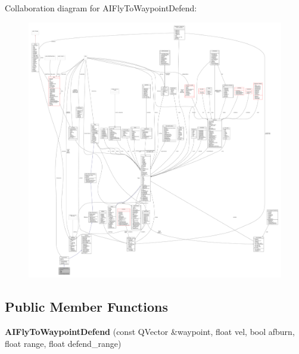 Collaboration diagram for A\+I\+Fly\+To\+Waypoint\+Defend\+:
\nopagebreak
\begin{figure}[H]
\begin{center}
\leavevmode
\includegraphics[width=350pt]{dc/db7/classAIFlyToWaypointDefend__coll__graph}
\end{center}
\end{figure}
\subsection*{Public Member Functions}
\begin{DoxyCompactItemize}
\item 
{\bfseries A\+I\+Fly\+To\+Waypoint\+Defend} (const Q\+Vector \&waypoint, float vel, bool afburn, float range, float defend\+\_\+range)\hypertarget{classAIFlyToWaypointDefend_a0524993f97fe5c9ea10c2dcc2634d929}{}\label{classAIFlyToWaypointDefend_a0524993f97fe5c9ea10c2dcc2634d929}

\end{DoxyCompactItemize}
